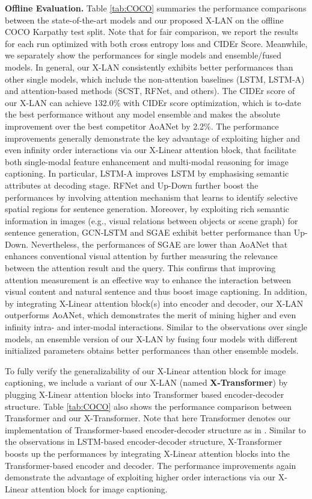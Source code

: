 \documentclass[10pt,twocolumn,letterpaper]{article}
\begin{document}
\noindent\textbf{Offline Evaluation.}
Table \ref{tab:COCO} summaries the performance comparisons between the state-of-the-art models and our proposed X-LAN on the offline COCO Karpathy test split. Note that for fair comparison, we report the results for each run optimized with both cross entropy loss and CIDEr Score. Meanwhile, we separately show the performances for single models and ensemble/fused models. In general, our X-LAN consistently exhibits better performances than other single models, which include the non-attention baselines (LSTM, LSTM-A) and attention-based methods (SCST, RFNet, and others). The CIDEr score of our X-LAN can achieve 132.0\% with CIDEr score optimization, which is to-date the best performance without any model ensemble and makes the absolute improvement over the best competitor AoANet by 2.2\%. The performance improvements generally demonstrate the key advantage of exploiting higher and even infinity order interactions via our X-Linear attention block, that facilitate both single-modal feature enhancement and multi-modal reasoning for image captioning. In particular, LSTM-A improves LSTM by emphasising semantic attributes at decoding stage. RFNet and Up-Down further boost the performances by involving attention mechanism that learns to identify selective spatial regions for sentence generation. Moreover, by exploiting rich semantic information in images (e.g., visual relations between objects or scene graph) for sentence generation, GCN-LSTM and SGAE exhibit better performance than Up-Down. Nevertheless, the performances of SGAE are lower than AoANet that enhances conventional visual attention by further measuring the relevance between the attention result and the query. This confirms that improving attention measurement is an effective way to enhance the interaction between visual content and natural sentence and thus boost image captioning. In addition, by integrating X-Linear attention block(s) into encoder and decoder, our X-LAN outperforms AoANet, which demonstrates the merit of mining higher and even infinity intra- and inter-modal interactions. Similar to the observations over single models, an ensemble version of our X-LAN by fusing four models with different initialized parameters obtains better performances than other ensemble models.

To fully verify the generalizability of our X-Linear attention block for image captioning, we include a variant of our X-LAN (named \textbf{X-Transformer}) by plugging X-Linear attention blocks into Transformer based encoder-decoder structure.
Table \ref{tab:COCO} also shows the performance comparison between Transformer and our X-Transformer. Note that here Transformer denotes our implementation of Transformer-based encoder-decoder structure as in \cite{sharma2018conceptual}. Similar to the observations in LSTM-based encoder-decoder structure, X-Transformer boosts up the performances by integrating X-Linear attention blocks into the Transformer-based encoder and decoder.
The performance improvements again demonstrate the advantage of exploiting higher order interactions via our X-Linear attention block for image captioning.
\end{document}
